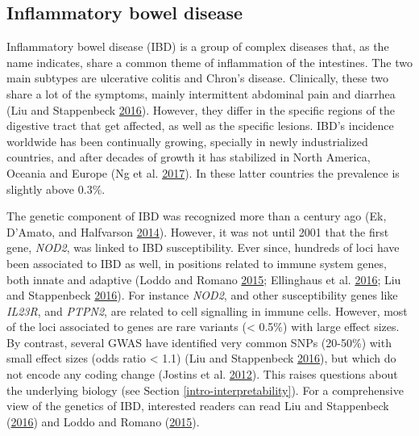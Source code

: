 \documentclass[
  11pt,
]{env/yjiao}
\begin{document}
\hypertarget{inflammatory-bowel-disease}{%
\subsection{Inflammatory bowel disease}\label{inflammatory-bowel-disease}}

Inflammatory bowel disease (IBD) is a group of complex diseases that, as the name indicates, share a common theme of inflammation of the intestines. The two main subtypes are ulcerative colitis and Chron's disease. Clinically, these two share a lot of the symptoms, mainly intermittent abdominal pain and diarrhea (Liu and Stappenbeck \protect\hyperlink{ref-liu_genetics_2016}{2016}). However, they differ in the specific regions of the digestive tract that get affected, as well as the specific lesions. IBD's incidence worldwide has been continually growing, specially in newly industrialized countries, and after decades of growth it has stabilized in North America, Oceania and Europe (Ng et al. \protect\hyperlink{ref-ng_worldwide_2017}{2017}). In these latter countries the prevalence is slightly above 0.3\%.

The genetic component of IBD was recognized more than a century ago (Ek, D'Amato, and Halfvarson \protect\hyperlink{ref-ek_history_2014}{2014}). However, it was not until 2001 that the first gene, \emph{NOD2}, was linked to IBD susceptibility. Ever since, hundreds of loci have been associated to IBD as well, in positions related to immune system genes, both innate and adaptive (Loddo and Romano \protect\hyperlink{ref-loddo_inflammatory_2015}{2015}; Ellinghaus et al. \protect\hyperlink{ref-ellinghaus_analysis_2016}{2016}; Liu and Stappenbeck \protect\hyperlink{ref-liu_genetics_2016}{2016}). For instance \emph{NOD2}, and other susceptibility genes like \emph{IL23R}, and \emph{PTPN2}, are related to cell signalling in immune cells. However, most of the loci associated to genes are rare variants (\textless{} 0.5\%) with large effect sizes. By contrast, several GWAS have identified very common SNPs (20-50\%) with small effect sizes (odds ratio \textless{} 1.1) (Liu and Stappenbeck \protect\hyperlink{ref-liu_genetics_2016}{2016}), but which do not encode any coding change (Jostins et al. \protect\hyperlink{ref-jostins_hostmicrobe_2012}{2012}). This raises questions about the underlying biology (see Section \ref{intro-interpretability}). For a comprehensive view of the genetics of IBD, interested readers can read Liu and Stappenbeck (\protect\hyperlink{ref-liu_genetics_2016}{2016}) and Loddo and Romano (\protect\hyperlink{ref-loddo_inflammatory_2015}{2015}).
\end{document}
